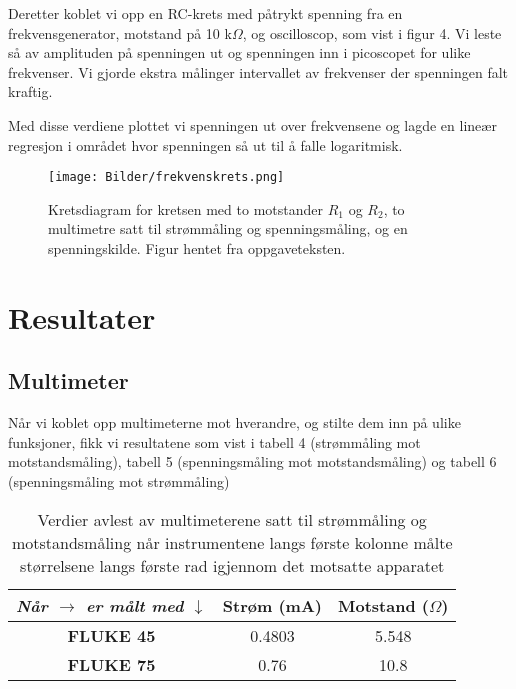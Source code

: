 \documentclass[norsk,a4paper,12pt]{article}
\begin{document}
Deretter koblet vi opp en RC-krets med påtrykt spenning fra en frekvensgenerator, motstand på 10 k$\Omega$, og oscilloscop, som vist i figur 4. Vi leste så av amplituden på spenningen ut og spenningen inn i picoscopet for ulike frekvenser. Vi gjorde ekstra målinger intervallet av frekvenser der spenningen falt kraftig. 

Med disse verdiene plottet vi spenningen ut over frekvensene og lagde en lineær regresjon i området hvor spenningen så ut til å falle logaritmisk.

\begin{figure}
\begin{center}
\texttt{[image: Bilder/frekvenskrets.png]}\\
\caption{Kretsdiagram for kretsen med to motstander $R_1$ og $R_2$, to multimetre satt til strømmåling og spenningsmåling, og en spenningskilde. Figur hentet fra oppgaveteksten.}\label{fig:frekvenskrets}
\end{center}
\end{figure}

\section{Resultater}

\subsection{Multimeter}

Når vi koblet opp multimeterne mot hverandre, og stilte dem inn på ulike funksjoner, fikk vi resultatene som vist i tabell 4 (strømmåling mot motstandsmåling), tabell 5 (spenningsmåling mot motstandsmåling) og tabell 6 (spenningsmåling mot strømmåling)

\begin{table}
  \begin{center}
  \caption{Verdier avlest av multimeterene satt til strømmåling og motstandsmåling når instrumentene langs første kolonne målte størrelsene langs første rad igjennom det motsatte apparatet}
  \begin{tabular}{|c|c|c|} \hline
  \textit{Når $\rightarrow$ er målt med $\downarrow$} & \textbf{Strøm (mA)} & \textbf{Motstand ($\Omega$)} \\ \hline
  \textbf{FLUKE 45} & 0.4803  & 5.548 \\ \hline
  \textbf{FLUKE 75} & 0.76 & 10.8 \\ \hline
  \end{tabular}
  \end{center}
  \label{tab:strømmotmotstand}
\end{table}
\end{document}
